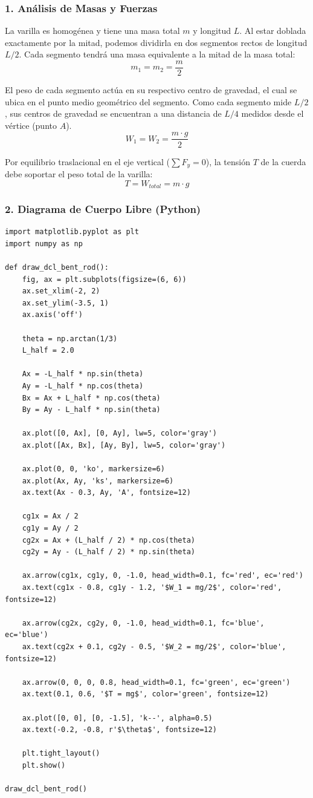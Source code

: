 \documentclass[12pt, a4paper]{article}
\begin{document}
\subsubsection*{1. Análisis de Masas y Fuerzas}
La varilla es homogénea y tiene una masa total $m$ y longitud $L$. Al estar doblada exactamente por la mitad, podemos dividirla en dos segmentos rectos de longitud $L/2$. Cada segmento tendrá una masa equivalente a la mitad de la masa total:
$$m_1 = m_2 = \frac{m}{2}$$

El peso de cada segmento actúa en su respectivo centro de gravedad, el cual se ubica en el punto medio geométrico del segmento. Como cada segmento mide $L/2$, sus centros de gravedad se encuentran a una distancia de $L/4$ medidos desde el vértice (punto $A$).
$$W_1 = W_2 = \frac{m \cdot g}{2}$$

Por equilibrio traslacional en el eje vertical ($\sum F_y = 0$), la tensión $T$ de la cuerda debe soportar el peso total de la varilla:
$$T = W_{total} = m \cdot g$$

\subsubsection*{2. Diagrama de Cuerpo Libre (Python)}

\begin{lstlisting}
import matplotlib.pyplot as plt
import numpy as np

def draw_dcl_bent_rod():
    fig, ax = plt.subplots(figsize=(6, 6))
    ax.set_xlim(-2, 2)
    ax.set_ylim(-3.5, 1)
    ax.axis('off')
    
    theta = np.arctan(1/3)
    L_half = 2.0
    
    Ax = -L_half * np.sin(theta)
    Ay = -L_half * np.cos(theta)
    Bx = Ax + L_half * np.cos(theta)
    By = Ay - L_half * np.sin(theta)
    
    ax.plot([0, Ax], [0, Ay], lw=5, color='gray')
    ax.plot([Ax, Bx], [Ay, By], lw=5, color='gray')
    
    ax.plot(0, 0, 'ko', markersize=6)
    ax.plot(Ax, Ay, 'ks', markersize=6)
    ax.text(Ax - 0.3, Ay, 'A', fontsize=12)
    
    cg1x = Ax / 2
    cg1y = Ay / 2
    cg2x = Ax + (L_half / 2) * np.cos(theta)
    cg2y = Ay - (L_half / 2) * np.sin(theta)
    
    ax.arrow(cg1x, cg1y, 0, -1.0, head_width=0.1, fc='red', ec='red')
    ax.text(cg1x - 0.8, cg1y - 1.2, '$W_1 = mg/2$', color='red', fontsize=12)
    
    ax.arrow(cg2x, cg2y, 0, -1.0, head_width=0.1, fc='blue', ec='blue')
    ax.text(cg2x + 0.1, cg2y - 0.5, '$W_2 = mg/2$', color='blue', fontsize=12)
    
    ax.arrow(0, 0, 0, 0.8, head_width=0.1, fc='green', ec='green')
    ax.text(0.1, 0.6, '$T = mg$', color='green', fontsize=12)
    
    ax.plot([0, 0], [0, -1.5], 'k--', alpha=0.5)
    ax.text(-0.2, -0.8, r'$\theta$', fontsize=12)

    plt.tight_layout()
    plt.show()

draw_dcl_bent_rod()
\end{lstlisting}
\end{document}
